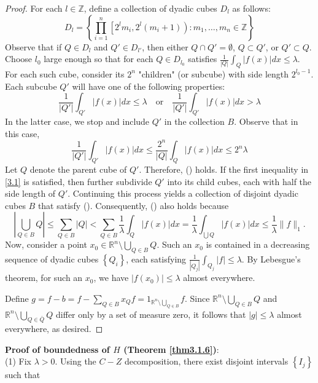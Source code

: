 \begin{proof}
For each $l \in \mathbb{Z}$, define a collection of dyadic cubes $D_l$ as follows:
$$
D_l = \left\{ \prod_{i=1}^n \left[ 2^l m_i, 2^l (m_i + 1) \right) : m_1, \ldots, m_n \in \mathbb{Z} \right\}
$$
Observe that if $Q \in D_l$ and $Q' \in D_{l'}$, then either $Q \cap Q' = \emptyset$, $Q \subset Q'$, or $Q' \subset Q$.
Choose $l_0$ large enough so that for each $Q \in D_{l_0}$ satisfies $\frac{1}{|Q|} \int_Q |f(x)| dx \leq \lambda$.
For each such cube, consider its $2^n$ "children" (or subcube) with side length $2^{l_0 - 1}$.
Each subcube $Q'$ will have one of the following properties:
\begin{equation}\label{3.1}
    \frac{1}{|Q'|} \int_{Q'} |f(x)| dx \leqslant \lambda \quad \text{or} \quad \frac{1}{|Q'|} \int_{Q'} |f(x)| dx > \lambda
\end{equation}
In the latter case, we stop and include $Q'$ in the collection $B$.
Observe that in this case,
$$
\frac{1}{|Q'|} \int_{Q'} |f(x)| dx \leqslant \frac{2^n}{|Q|} \int_Q |f(x)| dx \leqslant 2^n \lambda
$$
Let $Q$ denote the parent cube of $Q'$. Therefore, () holds. If the first inequality in \eqref{3.1} is satisfied, then further subdivide $Q'$ into its child cubes, each with half the side length of $Q'$. Continuing this process yields a collection of disjoint dyadic cubes $B$ that satisfy (). Consequently, () also holds because
$$
\left|\bigcup_{Q \in B} Q\right| \leq \sum_{Q \in B}|Q| < \sum_{Q \in B} \frac{1}{\lambda} \int_Q |f(x)| dx = \frac{1}{\lambda} \int_{\bigcup Q} |f(x)| dx \leq \frac{1}{\lambda} \|f\|_1.
$$
Now, consider a point $x_0 \in \mathbb{R}^n \setminus \bigcup_{Q \in B} Q$. Such an $x_0$ is contained in a decreasing sequence of dyadic cubes $\left\{Q_i\right\}$, each satisfying $\frac{1}{\left|Q_j\right|} \int_{Q_j} |f| \leq \lambda$.
By Lebesgue's theorem, for such an $x_0$, we have $\left|f\left(x_0\right)\right| \leq \lambda$ almost everywhere.

Define $g = f - b = f - \sum_{Q \in B} x_Q f = 1_{\mathbb{R}^n \setminus \bigcup_{Q \in B}} f$. Since $\mathbb{R}^n \setminus \bigcup_{Q \in B} Q$ and $\mathbb{R}^n \setminus \bigcup_{Q \in \bar{Q}} Q$ differ only by a set of measure zero, it follows that $|g| \leq \lambda$ almost everywhere, as desired.
\end{proof}
\noindent\textbf{Proof of boundedness of $H$ (Theorem \ref{thm3.1.6})}:\\
(1) Fix $\lambda > 0$. Using the $C-Z$ decomposition, there exist disjoint intervals $\left\{I_j\right\}$ such that
